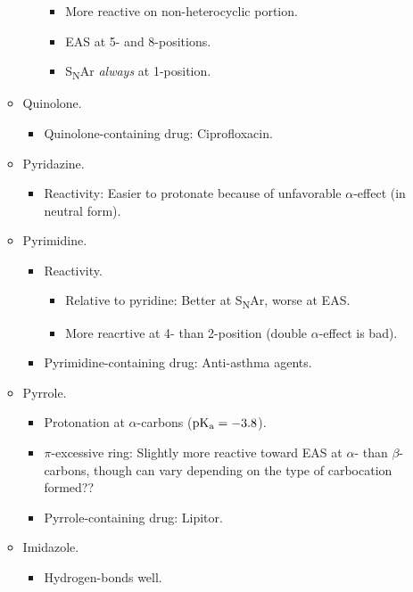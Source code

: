 \documentclass[../notes.tex]{subfiles}
\begin{document}
\begin{itemize}
\begin{itemize}
\begin{itemize}
\begin{itemize}
                \item More reactive on non-heterocyclic portion.
                \item EAS at 5- and 8-positions.
                \item S\textsubscript{N}Ar \emph{always} at 1-position.
            \end{itemize}
        \end{itemize}
        \item Quinolone.
        \begin{itemize}
            \item Quinolone-containing drug: Ciprofloxacin.
        \end{itemize}
        \item Pyridazine.
        \begin{itemize}
            \item Reactivity: Easier to protonate because of unfavorable $\alpha$-effect (in neutral form).
        \end{itemize}
        \item Pyrimidine.
        \begin{itemize}
            \item Reactivity.
            \begin{itemize}
                \item Relative to pyridine: Better at S\textsubscript{N}Ar, worse at EAS.
                \item More reacrtive at 4- than 2-position (double $\alpha$-effect is bad).
            \end{itemize}
            \item Pyrimidine-containing drug: Anti-asthma agents.
        \end{itemize}
        \item Pyrrole.
        \begin{itemize}
            \item Protonation at $\alpha$-carbons ($\operatorname{\text{p}K_\text{a}}=-3.8$).
            \item $\pi$-excessive ring: Slightly more reactive toward EAS at $\alpha$- than $\beta$-carbons, though can vary depending on the type of carbocation formed??
            \item Pyrrole-containing drug: Lipitor.
        \end{itemize}
        \item Imidazole.
        \begin{itemize}
            \item Hydrogen-bonds well.

\end{itemize}
\end{itemize}
\end{itemize}
\end{document}
